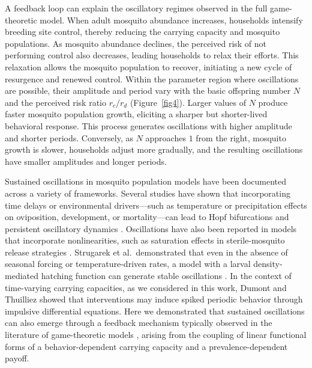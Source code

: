 \documentclass{article}
\theoremstyle{remark}
\theoremstyle{custom} %
\begin{document}
A feedback loop can explain the oscillatory regimes observed in the full game-theoretic model. When adult mosquito abundance increases, households intensify breeding site control, thereby reducing the carrying capacity and mosquito populations. As mosquito abundance declines, the perceived risk of not performing control also decreases, leading households to relax their efforts. This relaxation allows the mosquito population to recover, initiating a new cycle of resurgence and renewed control. Within the parameter region where oscillations are possible, their amplitude and period vary with the basic offspring number $N$ and the perceived risk ratio $r_c/r_d$ (Figure~\ref{fig4}). Larger values of $N$ produce faster mosquito population growth, eliciting a sharper but shorter-lived behavioral response. This process generates oscillations with higher amplitude and shorter periods. Conversely, as $N$ approaches $1$ from the right, mosquito growth is slower, households adjust more gradually, and the resulting oscillations have smaller amplitudes and longer periods.


Sustained oscillations in mosquito population models have been documented across a variety of frameworks. Several studies have shown that incorporating time delays or environmental drivers---such as temperature or precipitation effects on oviposition, development, or mortality---can lead to Hopf bifurcations and persistent oscillatory dynamics \cite{abdelrazec2017mathematical,okuneye2018mathematical,ngwa2010mathematical,cai2018dynamics}. Oscillations have also been reported in models that incorporate nonlinearities, such as saturation effects in sterile-mosquito release strategies \cite{cai2014dynamics,huang2019bifurcation,hussein2025residual,wang2024periodic}.  Strugarek et al.\ demonstrated that even in the absence of seasonal forcing or temperature-driven rates, a model with a larval density-mediated hatching function can generate stable oscillations \cite{strugarek2019oscillatory}. In the context of time-varying carrying capacities, as we considered in this work, Dumont and Thuilliez \cite{dumont_mosquito_control} showed that interventions may induce spiked periodic behavior through impulsive differential equations. Here we demonstrated that sustained oscillations can also emerge through a feedback mechanism typically observed in the literature of game-theoretic models \cite{bauch2005imitation, chang2020game, huang2022game}, arising from the coupling of linear functional forms of a behavior-dependent carrying capacity and a prevalence-dependent payoff.
\end{document}
